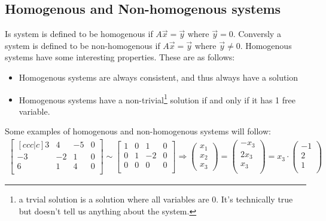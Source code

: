 \documentclass[11pt, a4paper]{article}
\begin{document}
\subsection{Homogenous and Non-homogenous systems}
Is system is defined to be homogenous if $A\vec{x} = \vec{y}$ where $\vec{y} = 0$.
Conversly a system is defined to be non-homogenous if $A\vec{x} = \vec{y}$ where $\vec{y} \neq 0$.
Homogenous systems have some interesting properties. These are as follows:
\begin{itemize}
  \item Homogenous systems are always consistent, and thus always have a solution
  \item Homogenous systems have a non-trivial\footnote{a trvial solution is a solution where all variables are 0. It's technically true but doesn't tell us anything about the system.} 
        solution if and only if it has 1 free variable.
\end{itemize}

Some examples of homogenous and non-homogenous systems will follow:
\begin{align*}
  \begin{bmatrix}[ccc|c]
    3 & 4 & -5 & 0\\
    -3 & -2 & 1 & 0\\
    6 & 1 & 4 & 0\\
  \end{bmatrix}
  \sim
  \begin{bmatrix}
    1 & 0 & 1 & 0\\
    0 & 1 & -2 & 0\\
    0 & 0 & 0 & 0\\
  \end{bmatrix}
  \Rightarrow
  \begin{pmatrix} x_1 \\ x_2 \\ x_3 \end{pmatrix}
  = \begin{pmatrix} -x_3\\ 2x_3\\ x_3\\ \end{pmatrix}
  = x_3 \cdot \begin{pmatrix} -1\\ 2\\ 1\\ \end{pmatrix}
\end{align*}
\end{document}
